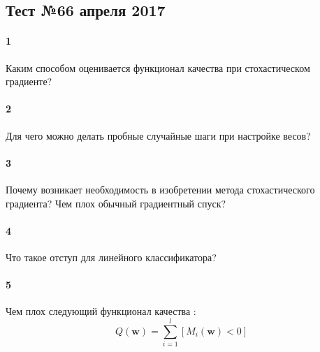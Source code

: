 \documentclass[a4paper,12pt]{article}
\begin{document}
  \subsection*{Тест №6\hfill{6 апреля 2017}}

  \paragraph{1} Каким способом оценивается функционал качества при стохастическом градиенте?
  
  \makebox[\linewidth]{\hrulefill}
  \makebox[\linewidth]{\hrulefill}
  
  \paragraph{2} Для чего можно делать пробные случайные шаги при настройке весов?
  
  \makebox[\linewidth]{\hrulefill}
  \makebox[\linewidth]{\hrulefill}

  \paragraph{3} Почему возникает необходимость в изобретении метода стохастического градиента? Чем плох обычный градиентный спуск?

  \makebox[\linewidth]{\hrulefill}
  \makebox[\linewidth]{\hrulefill}
  \makebox[\linewidth]{\hrulefill}

  \paragraph{4} Что такое отступ для линейного классификатора?
    
  \makebox[\linewidth]{\hrulefill}
  \makebox[\linewidth]{\hrulefill}
  \makebox[\linewidth]{\hrulefill}
  
  \paragraph{5} Чем плох следующий функционал качества :
  $$Q(\mathbf{w}) = \sum\limits_{i=1}^l \left[ M_i(\mathbf{w}) < 0 \right] $$

  \makebox[\linewidth]{\hrulefill}
  \makebox[\linewidth]{\hrulefill}
  \makebox[\linewidth]{\hrulefill}
  \makebox[\linewidth]{\hrulefill}
  
\end{document}
